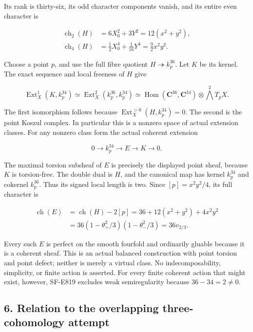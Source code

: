 Its rank is thirty-six, its odd character components vanish, and its
entire even character is

\[
 \begin{aligned}
 \operatorname{ch}_2(H)&=6X_0^2+3Y^2=12(x^2+y^2),\\
 \operatorname{ch}_4(H)&=\tfrac12 X_0^4+\tfrac1{16}Y^4
                         =\tfrac92 x^2y^2.
 \end{aligned}
 \tag{E819.17}
\]

Choose a point \(p\), and use the full fibre quotient
\(H\twoheadrightarrow k_p^{36}\). Let \(K\) be its kernel. The exact
sequence and local freeness of \(H\) give

\[
 \operatorname{Ext}^1_X(K,k_p^{34})
     \simeq\operatorname{Ext}^2_X(k_p^{36},k_p^{34})
     \simeq\operatorname{Hom}(\mathbf C^{36},\mathbf C^{34})
                   \otimes\bigwedge^2T_pX.
 \tag{E819.18}
\]

The first isomorphism follows because
\(\operatorname{Ext}^{>0}_X(H,k_p^{34})=0\). The second is the point
Koszul complex. In particular this is a nonzero space of actual
extension classes. For any nonzero class form the actual coherent
extension

\[
 0\longrightarrow k_p^{34}\longrightarrow E\longrightarrow K
          \longrightarrow0.
 \tag{E819.19}
\]

The maximal torsion subsheaf of \(E\) is precisely the displayed point
sheaf, because \(K\) is torsion-free. The double dual is \(H\), and the
canonical map has kernel \(k_p^{34}\) and cokernel \(k_p^{36}\). Thus
its signed local length is two. Since \([p]=x^2y^2/4\), its full
character is

\[
 \begin{split}
 \operatorname{ch}(E)
  &=\operatorname{ch}(H)-2[p]
    =36+12(x^2+y^2)+4x^2y^2\\
  &=36(1-\theta_+^2/3)(1-\theta_-^2/3)
    =36v_{2/3}.
 \end{split}
 \tag{E819.20}
\]

Every such \(E\) is perfect on the smooth fourfold and ordinarily
gluable because it is a coherent sheaf. This is an actual balanced
construction with point torsion and point defect; neither is merely a
virtual class. No indecomposability, simplicity, or finite action is
asserted. For every finite coherent action that might exist, however,
SF-E819 excludes weak semiregularity because \(36-34=2\ne0\).

\subsection{6. Relation to the overlapping three-cohomology
attempt}\label{SF-E819-relation-to-the-overlapping-three-cohomology-attempt}

